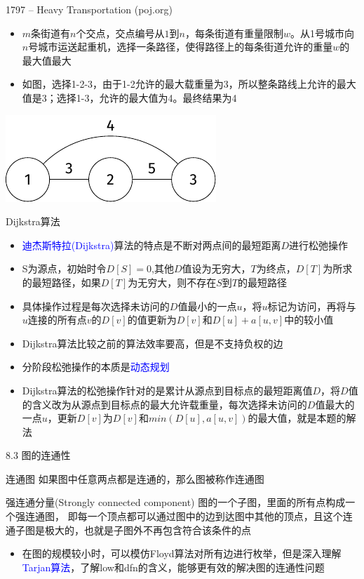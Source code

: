 \begin{frame}{1797 -- Heavy Transportation (poj.org)}
    \begin{itemize}
        \item $m$条街道有$n$个交点，交点编号从$1$到$n$，每条街道有重量限制$w$。从1号城市向$n$号城市运送起重机，选择一条路径，使得路径上的每条街道允许的重量$w$的最大值最大
        \item 如图，选择1-2-3，由于1-2允许的最大载重量为3，所以整条路线上允许的最大值是3；选择1-3，允许的最大值为4。最终结果为4
    \end{itemize}
    \includegraphics[center]{fig/8-5.pdf}
\end{frame}
\begin{frame}{Dijkstra算法}
    \begin{itemize}
        \item \textcolor{blue}{迪杰斯特拉(Dijkstra)}算法的特点是不断对两点间的最短距离$D$进行松弛操作
        \item S为源点，初始时令$D[S]=0$,其他$D$值设为无穷大，$T$为终点，$D[T]$为所求的最短路径，如果$D[T]$为无穷大，则不存在$S$到$T$的最短路径
        \item 具体操作过程是每次选择未访问的$D$值最小的一点$u$，将$u$标记为访问，再将与$u$连接的所有点$v$的$D[v]$的值更新为$D[v]$和$D[u]+a[u,v]$中的较小值
        \item Dijkstra算法比较之前的算法效率要高，但是不支持负权的边
        \item 分阶段松弛操作的本质是\textcolor{blue}{动态规划}
        \item Dijkstra算法的松弛操作针对的是累计从源点到目标点的最短距离值$D$，将$D$值的含义改为从源点到目标点的最大允许载重量，每次选择未访问的$D$值最大的一点$u$，更新$D[v]$为$D[v]$和$min(D[u],a[u,v])$的最大值，就是本题的解法
    \end{itemize}
\end{frame}
\begin{frame}{8.3 图的连通性}
    \begin{block}{连通图}
        如果图中任意两点都是连通的，那么图被称作连通图
    \end{block}
    \vfill
    \begin{block}{强连通分量(Strongly connected component)}
        图的一个子图，里面的所有点构成一个强连通图， 即每一个顶点都可以通过图中的边到达图中其他的顶点，且这个连通子图是极大的，也就是子图外不再包含符合该条件的点
    \end{block}
    \vfill
    \begin{itemize}
        \item 在图的规模较小时，可以模仿Floyd算法对所有边进行枚举，但是深入理解\textcolor{blue}{Tarjan算法}，了解low和dfn的含义，能够更有效的解决图的连通性问题
    \end{itemize}
\end{frame}
